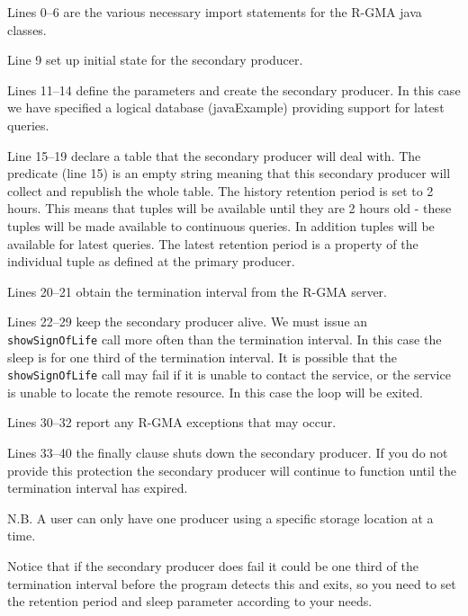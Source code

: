 Lines 0--6 are the various necessary import statements for the R-GMA
java classes.

Line 9 set up initial state for the secondary producer.

Lines 11--14 define the parameters and create the secondary
producer. In this case we have specified a logical database
(javaExample) providing support for latest queries.

Line 15--19 declare a table that the secondary producer will deal
with. The predicate (line 15) is an empty string meaning that this
secondary producer will collect and republish the whole table. The
history retention period is set to 2 hours. This means that tuples
will be available until they are 2 hours old - these tuples will be
made available to continuous queries. In addition tuples will be
available for latest queries. The latest retention period is a
property of the individual tuple as defined at the primary producer.

Lines 20--21 obtain the termination interval from the R-GMA server.

Lines 22--29 keep the secondary producer alive. We must issue
an \texttt{showSignOfLife} call more often than the termination
interval. In this case the sleep is for one third of the termination
interval. It is possible that the \texttt{showSignOfLife} call may
fail if it is unable to contact the service, or the service is unable
to locate the remote resource. In this case the loop will be exited.

Lines 30--32 report any R-GMA exceptions that may occur.

Lines 33--40 the finally clause shuts down the secondary producer. If
you do not provide this protection the secondary producer will
continue to function until the termination interval has expired.

N.B. A user can only have one producer using a specific storage
location at a time.

Notice that if the secondary producer does fail it could be one third
of the termination interval before the program detects this and exits,
so you need to set the retention period and sleep parameter according
to your needs.


